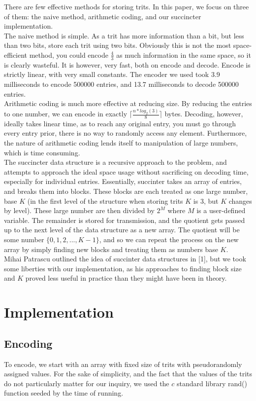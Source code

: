 \documentclass{article}
\begin{document}
\indent There are few effective methods for storing trits. In this paper, we focus on three of them: the naive method, arithmetic coding, and our succincter implementation.\\
\indent The naive method is simple. As a trit has more information than a bit, but less than two bits, store each trit using two bits. Obviously this is not the most space-efficient method, you could encode $\frac{4}{3}$ as much information in the same space, so it is clearly wasteful. It is however, very fast, both on encode and decode. Encode is strictly linear, with very small constants. The encoder we used took 3.9 milliseconds to encode 500000 entries, and 13.7 milliseconds to decode 500000 entries.\\
\indent Arithmetic coding is much more effective at reducing size. By reducing the entries to one number, we can encode in exactly $\lceil \frac{n*log_2(3)}{8}\rceil$ bytes. Decoding, however, ideally takes linear time, as to reach any original entry, you must go through every entry prior, there is no way to randomly access any element. Furthermore, the nature of arithmetic coding lends itself to manipulation of large numbers, which is time consuming.\\
\indent The succincter data structure is a recursive approach to the problem, and attempts to approach the ideal space usage without sacrificing on decoding time, especially for individual entries. Essentially, succinter takes an array of entries, and breaks them into blocks. These blocks are each treated as one large number, base $K$ (in the first level of the structure when storing trits $K$ is 3, but $K$ changes by level). These large number are then divided by $2^M$ where $M$ is a user-defined variable. The remainder is stored for transmission, and the quotient gets passed up to the next level of the data structure as a new array. The quotient will be some number $\{0 , 1, 2, ... , K -1\}$, and so we can repeat the process on the new array by simply finding new blocks and treating them as numbers base $K$.\\
\indent Mihai Patrascu outlined the idea of succinter data structures in [1], but we took some liberties with our implementation, as his approaches to finding block size and $K$ proved less useful in practice than they might have been in theory.

\noindent \section{Implementation}
\noindent \subsection{Encoding}
To encode, we start with an array with fixed size of trits with pseudorandomly assigned values. For the sake of simplicity, and the fact that the values of the trits do not particularly matter for our inquiry, we used the $c$ standard library rand() function seeded by the time of running. \\
\end{document}
